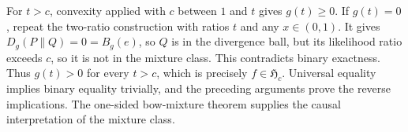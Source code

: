 For \(t>c\), convexity applied with \(c\) between \(1\) and \(t\) gives \(g(t)\ge0\).  If \(g(t)=0\), repeat the two-ratio construction with ratios \(t\) and any \(x\in(0,1)\).  It gives \(D_g(P\|Q)=0=B_g(e)\), so \(Q\) is in the divergence ball, but its likelihood ratio exceeds \(c\), so it is not in the mixture class.  This contradicts binary exactness.  Thus \(g(t)>0\) for every \(t>c\), which is precisely \(f\in\mathfrak H_c\).  Universal equality implies binary equality trivially, and the preceding arguments prove the reverse implications.  The one-sided bow-mixture theorem supplies the causal interpretation of the mixture class.